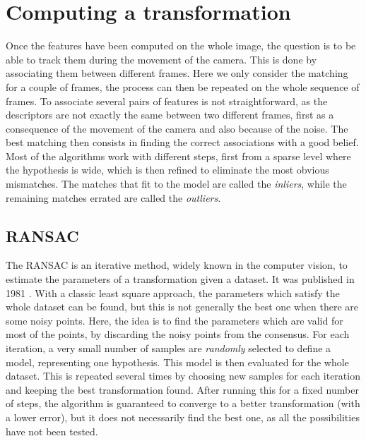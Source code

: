 \section{Computing a transformation}

Once the features have been computed on the whole image, the question is to be able to track them during the movement of the camera. This is done by associating them between different frames. Here we only consider the matching for a couple of frames, the process can then be repeated on the whole sequence of frames. To associate several pairs of features is not straightforward, as the descriptors are not exactly the same between two different frames, first as a consequence of the movement of the camera and also because of the noise. The best matching then consists in finding the correct associations with a good belief. Most of the algorithms work with different steps, first from a sparse level where the hypothesis is wide, which is then refined to eliminate the most obvious mismatches. The matches that fit to the model are called the \emph{inliers}, while the remaining matches errated are called the \emph{outliers}.

\subsection{RANSAC}
\label{sub:ransac}

The \gls{RANSAC} is an iterative method, widely known in the computer vision, to estimate the parameters of a transformation given a dataset. It was published in 1981 \cite{FischlerB81}. With a classic least square approach, the parameters which satisfy the whole dataset can be found, but this is not generally the best one when there are some noisy points. Here, the idea is to find the parameters which are valid for most of the points, by discarding the noisy points from the consensus. For each iteration, a very small number of samples are \emph{randomly} selected to define a model, representing one hypothesis. This model is then evaluated for the whole dataset. This is repeated several times by choosing new samples for each iteration and keeping the best transformation found. After running this for a fixed number of steps, the algorithm is guaranteed to converge to a better transformation (with a lower error), but it does not necessarily find the best one, as all the possibilities have not been tested. 

